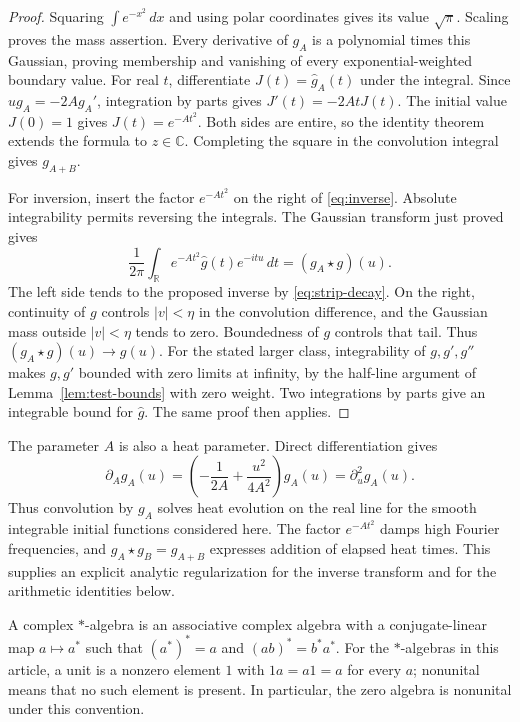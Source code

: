 \documentclass[11pt]{article}
\theoremstyle{definition}
\theoremstyle{remark}
\numberwithin{equation}{section}
\newcommand{\R}{\mathbb R}
\newcommand{\C}{\mathbb C}
\begin{document}
\begin{proof}
Squaring $\int e^{-x^2}\,dx$ and using polar coordinates gives its value
$\sqrt\pi$.  Scaling proves the mass assertion.
Every derivative of $g_A$ is a polynomial times this Gaussian, proving
membership and vanishing of every exponential-weighted boundary value.
For real $t$, differentiate $J(t)=\widehat g_A(t)$ under the integral.
Since $u g_A=-2A g_A'$, integration by parts gives
$J'(t)=-2AtJ(t)$.  The initial value $J(0)=1$ gives $J(t)=e^{-At^2}$.
Both sides are entire, so the identity theorem extends the formula to $z\in\C$.
Completing the square in the convolution integral gives $g_{A+B}$.

For inversion, insert the factor $e^{-At^2}$ on the right of
\eqref{eq:inverse}.  Absolute integrability permits reversing the integrals.
The Gaussian transform just proved gives
\[
 \frac1{2\pi}\int_{\R}e^{-At^2}\widehat g(t)e^{-itu}\,dt
       =(g_A\star g)(u).
\]
The left side tends to the proposed inverse by \eqref{eq:strip-decay}.
On the right, continuity of $g$ controls $|v|<\eta$ in the convolution
difference, and the Gaussian mass outside $|v|<\eta$ tends to zero.
Boundedness of $g$ controls that tail.  Thus $(g_A\star g)(u)\to g(u)$.
For the stated larger class, integrability of $g,g',g''$ makes $g,g'$
bounded with zero limits at infinity, by the half-line argument of
Lemma~\ref{lem:test-bounds} with zero weight.
Two integrations by parts give an integrable bound for $\widehat g$.
The same proof then applies.
\end{proof}

The parameter $A$ is also a heat parameter.  Direct differentiation gives
\[
 \partial_A g_A(u)=\left(-\frac1{2A}+\frac{u^2}{4A^2}\right)g_A(u)
                  =\partial_u^2g_A(u).
\]
Thus convolution by $g_A$ solves heat evolution on the real line for the
smooth integrable initial functions considered here.
The factor $e^{-At^2}$ damps high Fourier frequencies, and
$g_A\star g_B=g_{A+B}$ expresses addition of elapsed heat times.
This supplies an explicit analytic regularization for the inverse transform
and for the arithmetic identities below.

A complex $*$-algebra is an associative complex algebra with a conjugate-linear
map $a\mapsto a^*$ such that $(a^*)^*=a$ and $(ab)^*=b^*a^*$.
For the $*$-algebras in this article, a unit is a nonzero element $1$
with $1a=a1=a$ for every $a$;
nonunital means that no such element is present.
In particular, the zero algebra is nonunital under this convention.
\end{document}

